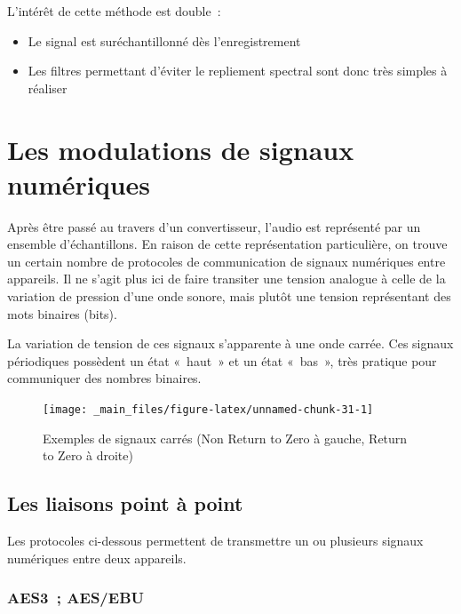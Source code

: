 \documentclass[
]{book}
\providecommand{\tightlist}{%
  \setlength{\itemsep}{0pt}\setlength{\parskip}{0pt}}
\begin{document}
L'intérêt de cette méthode est double~:

\begin{itemize}
\tightlist
\item
  Le signal est suréchantillonné dès l'enregistrement
\item
  Les filtres permettant d'éviter le repliement spectral sont donc très simples à réaliser
\end{itemize}

\hypertarget{les-modulations-de-signaux-numuxe9riques}{%
\chapter{Les modulations de signaux numériques}\label{les-modulations-de-signaux-numuxe9riques}}

Après être passé au travers d'un convertisseur, l'audio est représenté par un ensemble d'échantillons. En raison de cette représentation particulière, on trouve un certain nombre de protocoles de communication de signaux numériques entre appareils. Il ne s'agit plus ici de faire transiter une tension analogue à celle de la variation de pression d'une onde sonore, mais plutôt une tension représentant des mots binaires (bits).

La variation de tension de ces signaux s'apparente à une onde carrée. Ces signaux périodiques possèdent un état «~haut~» et un état «~bas~», très pratique pour communiquer des nombres binaires.

\begin{figure}

{\centering \texttt{[image: \_main\_files/figure-latex/unnamed-chunk-31-1]} 

}

\caption{Exemples de signaux carrés (Non Return to Zero à gauche, Return to Zero à droite)}\label{fig:unnamed-chunk-31}
\end{figure}

\hypertarget{les-liaisons-point-uxe0-point}{%
\section{Les liaisons point à point}\label{les-liaisons-point-uxe0-point}}

Les protocoles ci-dessous permettent de transmettre un ou plusieurs signaux numériques entre deux appareils.

\hypertarget{aes3-aesebu}{%
\subsection{AES3~; AES/EBU}\label{aes3-aesebu}}
\end{document}
